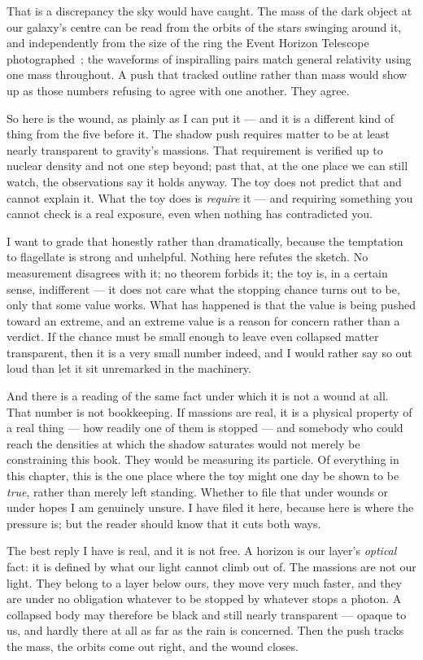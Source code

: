 \documentclass[fontsize=11pt,paper=a4,pagesize=auto,parskip=half-]{scrbook}
\begin{document}
That is a discrepancy the sky would have caught. The mass of the dark object at our galaxy's centre can be read from the orbits of the stars swinging around it, and independently from the size of the ring the Event Horizon Telescope photographed~\cite{eht2022}; the waveforms of inspiralling pairs match general relativity using one mass throughout. A push that tracked outline rather than mass would show up as those numbers refusing to agree with one another. They agree.

So here is the wound, as plainly as I can put it --- and it is a different kind of thing from the five before it. The shadow push requires matter to be at least nearly transparent to gravity's massions. That requirement is verified up to nuclear density and not one step beyond; past that, at the one place we can still watch, the observations say it holds anyway. The toy does not predict that and cannot explain it. What the toy does is \emph{require} it --- and requiring something you cannot check is a real exposure, even when nothing has contradicted you.

I want to grade that honestly rather than dramatically, because the temptation to flagellate is strong and unhelpful. Nothing here refutes the sketch. No measurement disagrees with it; no theorem forbids it; the toy is, in a certain sense, indifferent --- it does not care what the stopping chance turns out to be, only that some value works. What has happened is that the value is being pushed toward an extreme, and an extreme value is a reason for concern rather than a verdict. If the chance must be small enough to leave even collapsed matter transparent, then it is a very small number indeed, and I would rather say so out loud than let it sit unremarked in the machinery.

And there is a reading of the same fact under which it is not a wound at all. That number is not bookkeeping. If massions are real, it is a physical property of a real thing --- how readily one of them is stopped --- and somebody who could reach the densities at which the shadow saturates would not merely be constraining this book. They would be measuring its particle. Of everything in this chapter, this is the one place where the toy might one day be shown to be \emph{true}, rather than merely left standing. Whether to file that under wounds or under hopes I am genuinely unsure. I have filed it here, because here is where the pressure is; but the reader should know that it cuts both ways.

The best reply I have is real, and it is not free. A horizon is our layer's \emph{optical} fact: it is defined by what our light cannot climb out of. The massions are not our light. They belong to a layer below ours, they move very much faster, and they are under no obligation whatever to be stopped by whatever stops a photon. A collapsed body may therefore be black and still nearly transparent --- opaque to us, and hardly there at all as far as the rain is concerned. Then the push tracks the mass, the orbits come out right, and the wound closes.
\end{document}
